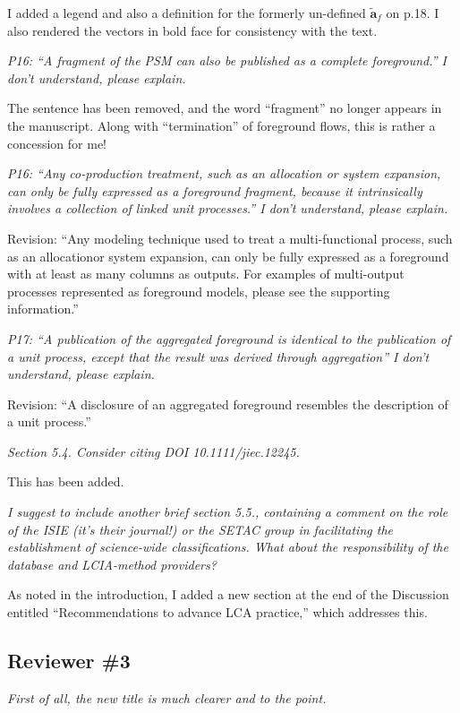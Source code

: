 \documentclass[11pt,letterpaper]{article}
\begin{document}
I added a legend and also a definition for the formerly un-defined $\tilde{\mathbf{a}}_f$ on p.18.  I also rendered the vectors in bold face for consistency with the text.

\emph{P16: “A fragment of the PSM can also be published as a complete foreground.” I don’t understand, please explain.}

The sentence has been removed, and the word ``fragment'' no longer appears in the manuscript.  Along with ``termination'' of foreground flows, this is rather a concession for me!

\emph{P16: “Any co-production treatment, such as an allocation or system expansion, can only be fully expressed as a foreground fragment, because it intrinsically involves a collection of linked unit processes.” I don’t understand, please explain.}

Revision: ``Any modeling technique used to treat a multi-functional process, such as an allocationor system expansion, can only be fully expressed as a foreground with at least as many columns as
outputs. For examples of multi-output processes represented as foreground models, please see the
supporting information.''

\emph{P17: “A publication of the aggregated foreground is identical to the publication of a unit process, except that the result was derived through aggregation” I don’t understand, please explain.}

Revision: ``A disclosure of an aggregated foreground resembles the description of a unit process.''

\emph{Section 5.4. Consider citing DOI 10.1111/jiec.12245.}

This has been added.

\emph{I suggest to include another brief section 5.5., containing a comment on the role of the ISIE (it’s their journal!) or the SETAC group in facilitating the establishment of science-wide classifications. What about the responsibility of the database and LCIA-method providers?}

As noted in the introduction, I added a new section at the end of the Discussion entitled ``Recommendations to advance LCA practice,'' which addresses this.

\subsection*{Reviewer \#3}

\emph{First of all, the new title is much clearer and to the point.}
\end{document}
